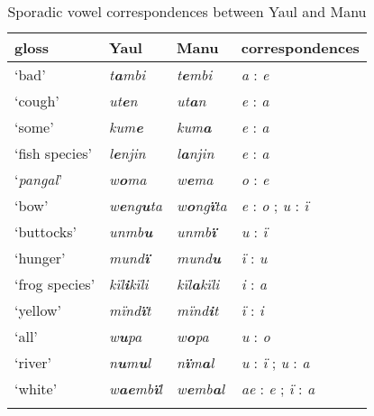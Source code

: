 \begin{table}
\caption{Sporadic vowel correspondences between Yaul and Manu}
\label{tab:18.21}


\begin{tabular}{llll}

\lsptoprule

gloss & Yaul & Manu & correspondences\\
\midrule
‘bad’ & {\itshape t\textbf{a}mbi} & {\itshape t\textbf{e}mbi} & \textit{a} : \textit{e}\\
‘cough’ & {\itshape ut\textbf{e}n} & {\itshape ut\textbf{a}n} & \textit{e} : \textit{a}\\
‘some’ & {\itshape kum\textbf{e}} & {\itshape kum\textbf{a}} & \textit{e} : \textit{a}\\
‘fish species’ & {\itshape l\textbf{e}njin} & {\itshape l\textbf{a}njin} & \textit{e} : \textit{a}\\
‘\textit{pangal}’ & {\itshape w\textbf{o}ma} & {\itshape w\textbf{e}ma} & \textit{o} : \textit{e}\\
‘bow’ & {\itshape w\textbf{e}ng\textbf{u}ta} & {\itshape w\textbf{o}ng\textbf{ï}ta} & \textit{e} : \textit{o} ; \textit{u} : \textit{ï}\\
‘buttocks’ & {\itshape unmb\textbf{u}} & {\itshape unmb\textbf{ï}} & \textit{u} : \textit{ï}\\
‘hunger’ & {\itshape mund\textbf{ï}} & {\itshape mund\textbf{u}} & \textit{ï} : \textit{u}\\
‘frog species’ & {\itshape kïl\textbf{i}kïli} & {\itshape kïl\textbf{a}kïli} & \textit{i} : \textit{a}\\
‘yellow’ & {\itshape mïnd\textbf{ï}t} & {\itshape mïnd\textbf{i}t} & \textit{ï} : \textit{i}\\
‘all’ & {\itshape w\textbf{u}pa} & {\itshape w\textbf{o}pa} & \textit{u} : \textit{o}\\
‘river’ & {\itshape n\textbf{u}m\textbf{u}l} & {\itshape n\textbf{ï}m\textbf{a}l} & \textit{u} : \textit{ï} ; \textit{u} : \textit{a}\\
‘white’ & {\itshape w\textbf{ae}mb\textbf{ï}l} & {\itshape w\textbf{e}mb\textbf{a}l} & \textit{ae} : \textit{e} ; \textit{ï} : \textit{a}\\
\lspbottomrule
\end{tabular}
\end{table}



